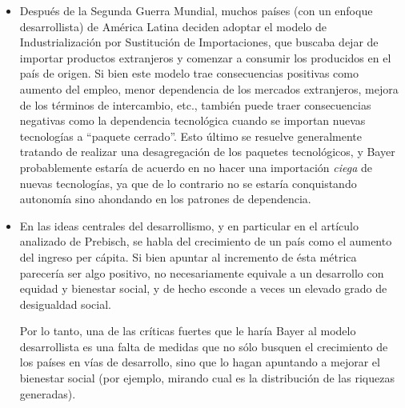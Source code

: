  \begin{itemize}
     \item Después de la Segunda Guerra Mundial, muchos países (con un enfoque desarrollista) de América Latina deciden adoptar el modelo de Industrialización por Sustitución de Importaciones, que buscaba dejar de importar productos extranjeros y comenzar a consumir los producidos en el país de origen. Si bien este modelo trae consecuencias positivas como aumento del empleo, menor dependencia de los mercados extranjeros, mejora de los términos de intercambio, etc., también puede traer consecuencias negativas como la dependencia tecnológica cuando se importan nuevas tecnologías a ``paquete cerrado''.
        Esto último se resuelve generalmente tratando de realizar una desagregación de los paquetes tecnológicos, y Bayer probablemente estaría de acuerdo en no hacer una importación \textit{ciega} de nuevas tecnologías, ya que de lo contrario no se estaría conquistando autonomía sino ahondando en los patrones de dependencia.

     \item En las ideas centrales del desarrollismo, y en particular en el artículo analizado de Prebisch, se habla del crecimiento de un país como el aumento del ingreso per cápita. Si bien apuntar al incremento de ésta métrica parecería ser algo positivo, no necesariamente equivale a un desarrollo con equidad y bienestar social, y de hecho esconde a veces un elevado grado de desigualdad social.

        Por lo tanto, una de las críticas fuertes que le haría Bayer al modelo desarrollista es una falta de medidas que no sólo busquen el crecimiento de los países en vías de desarrollo, sino que lo hagan apuntando a mejorar el bienestar social (por ejemplo, mirando cual es la distribución de las riquezas generadas).
 \end{itemize}
